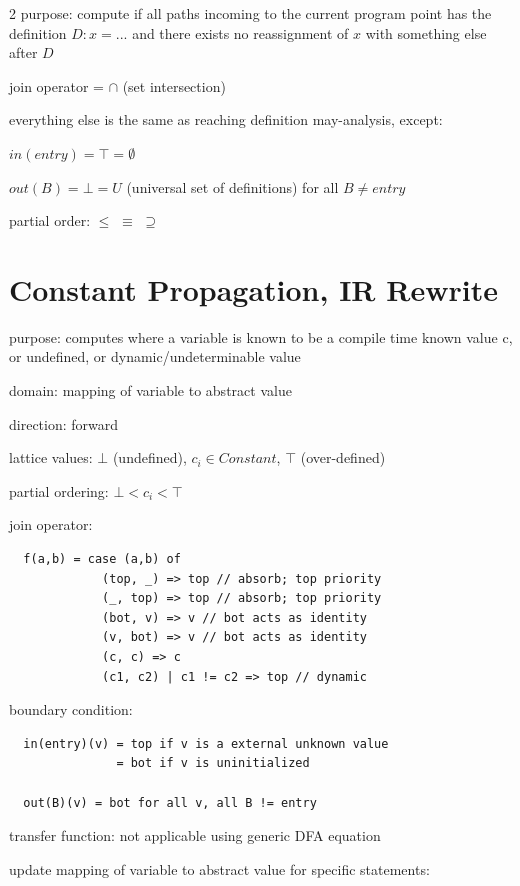 \documentclass[8pt]{extarticle}
\begin{document}
\begin{multicols*}{2}
  purpose: compute if all paths incoming to the current program point has the definition $D: x = ...$ and there exists no reassignment of $x$ with something else after $D$
  
  join operator = $\cap$ (set intersection)

  everything else is the same as reaching definition may-analysis, except:

  $in(entry) = \top = \emptyset$

  $out(B) = \bot = U$ (universal set of definitions) for all $B \neq entry$

  partial order: $\leq$ $\equiv$ $\supseteq$

  \vfill\null
  \columnbreak

  \section{Constant Propagation, IR Rewrite}
  
  purpose: computes where a variable is known to be a compile time known value c, or undefined, or dynamic/undeterminable value

  domain: mapping of variable to abstract value

  direction: forward

  lattice values: $\bot$ (undefined), $c_i \in Constant$, $\top$ (over-defined)

  partial ordering: $\bot < c_i < \top$
  
  join operator:

  \begin{verbatim}
  f(a,b) = case (a,b) of
             (top, _) => top // absorb; top priority
             (_, top) => top // absorb; top priority
             (bot, v) => v // bot acts as identity
             (v, bot) => v // bot acts as identity
             (c, c) => c
             (c1, c2) | c1 != c2 => top // dynamic
  \end{verbatim}

  boundary condition:

  \begin{verbatim}
  in(entry)(v) = top if v is a external unknown value
               = bot if v is uninitialized

  out(B)(v) = bot for all v, all B != entry
  \end{verbatim}

  transfer function: not applicable using generic DFA equation

  update mapping of variable to abstract value for specific statements:


\end{multicols*}
\end{document}
